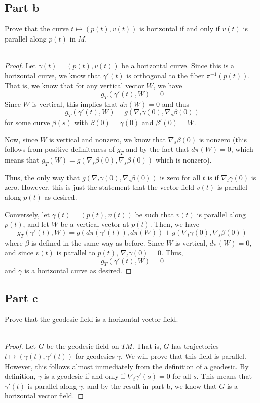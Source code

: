 \documentclass[fontsize=11pt]{scrartcl} %
\numberwithin{equation}{section} %
\numberwithin{figure}{section} %
\numberwithin{table}{section} %
\begin{document}
\subsection*{Part b}
Prove that the curve $t\mapsto (p(t),v(t))$ is horizontal if and only if $v(t)$
is parallel along $p(t)$ in $M$.
\\
\\
\begin{proof}
    Let $\gamma(t) = (p(t),v(t))$ be a horizontal curve. Since this is a
    horizontal curve, we know that $\gamma'(t)$ is orthogonal to the fiber
    $\pi^{-1}(p(t))$. That is, we know that for any vertical vector $W$, we have
    \[
        g_T(\gamma'(t),W) = 0
    \]
    Since $W$ is vertical, this implies that $d\pi(W) = 0$ and thus
    \[
        g_T(\gamma'(t),W) = g(\nabla_t\gamma(0),\nabla_s\beta(0))
    \]
    for some curve $\beta(s)$ with $\beta(0) = \gamma(0)$ and $\beta'(0)=W$.

    Now, since $W$ is vertical and nonzero, we know that $\nabla_s\beta(0)$ is
    nonzero (this follows from positive-definiteness of $g_T$ and by the fact
        that $d\pi(W) = 0$, which means that $g_T(W) =
    g(\nabla_s\beta(0),\nabla_s\beta(0))$ which is nonzero).

    Thus, the only way that $g(\nabla_t\gamma(0),\nabla_s\beta(0))$ is zero for
    all $t$ is if $\nabla_t\gamma(0)$ is zero. However, this is just the
    statement that the vector field $v(t)$ is parallel along $p(t)$ as desired.

    Conversely, let $\gamma(t)=(p(t),v(t))$ be such that $v(t)$ is parallel along
    $p(t)$, and let $W$ be a vertical vector at $p(t)$. Then, we have
    \[
        g_T(\gamma'(t),W) = g(d\pi(\gamma'(t)),d\pi(W)) +
        g(\nabla_t\gamma(0),\nabla_s\beta(0))
    \]
    where $\beta$ is defined in the same way as before. Since $W$ is vertical,
    $d\pi(W)=0$, and since $v(t)$ is parallel to $p(t)$, $\nabla_t\gamma(0)=0$.
    Thus,
    \[
        g_T(\gamma'(t),W) = 0
    \]
    and $\gamma$ is a horizontal curve as desired.
\end{proof}

\subsection{Part c}
Prove that the geodesic field is a horizontal vector field.
\\
\\
\begin{proof}
    Let $G$ be the geodesic field on $TM$. That is, $G$ has trajectories
    $t\mapsto (\gamma(t),\gamma'(t))$ for geodesics $\gamma$.
    We will prove that this field is parallel. However, this follows almost
    immediately from the definition of a geodesic. By definition, $\gamma$ is a
    geodesic if and only if $\nabla_t\gamma'(s) = 0$ for all $s$. This means
    that $\gamma'(t)$ is parallel along $\gamma$, and by the result in part b,
    we know that $G$ is a horizontal vector field.
\end{proof}
\end{document}
